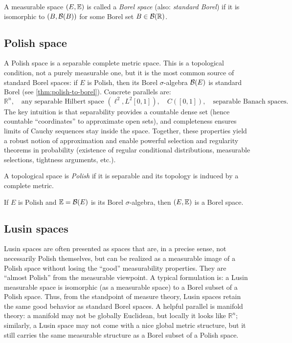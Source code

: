 \begin{definition}
\label{def:borelspace}
A measurable space $(E,\mathbb{E})$ is called a \emph{Borel space} (also: \emph{standard Borel})
if it is isomorphic to $(B,\mathcal{B}(B))$ for some Borel set $B\in \mathcal{B}(\mathbb{R})$.
\end{definition}

\subsection*{Polish space}
A Polish space is a separable complete metric space.
This is a topological condition, not a purely measurable one, but it is the most common source of standard Borel spaces:
if $E$ is Polish, then its Borel $\sigma$-algebra $\mathcal{B}(E)$ is standard Borel (see \ref{thm:polish-to-borel}).
Concrete parallels are:
\[
\mathbb{R}^n,\quad \text{any separable Hilbert space }(\ell^2, L^2[0,1]),\quad C([0,1]),\quad \text{separable Banach spaces}.
\]
The key intuition is that separability provides a countable dense set (hence countable ``coordinates'' to approximate open sets),
and completeness ensures limits of Cauchy sequences stay inside the space. Together, these properties yield a robust notion of
approximation and enable powerful selection and regularity theorems in probability (existence of regular conditional distributions,
measurable selections, tightness arguments, etc.).

\begin{definition}
A topological space is \emph{Polish} if it is separable and its topology is induced by a complete metric.
\end{definition}

\begin{theorem}
\label{thm:polish-to-borel}
If $E$ is Polish and $\mathbb{E}=\mathcal{B}(E)$ is its Borel $\sigma$-algebra, then $(E,\mathbb{E})$ is a Borel space.
\end{theorem}

\subsection*{Lusin spaces}

Lusin spaces are often presented as spaces that are, in a precise sense, not necessarily Polish themselves,
but can be realized as a measurable image of a Polish space without losing the ``good'' measurability properties. They are ``almost Polish'' from the measurable viewpoint.
A typical formulation is: a Lusin measurable space is isomorphic (as a measurable space) to a Borel subset of a Polish space.
Thus, from the standpoint of measure theory, Lusin spaces retain the same good behavior as standard Borel spaces.
A helpful parallel is manifold theory: a manifold may not be globally Euclidean, but locally it looks like $\mathbb{R}^n$;
similarly, a Lusin space may not come with a nice global metric structure, but it still carries the same measurable structure
as a Borel subset of a Polish space. 

